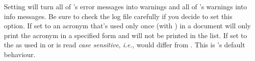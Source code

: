 \documentclass{acro-manual}
\newcommand*\latin[1]{\textit{#1}}
\begin{document}
\begin{options}
    Setting  will turn all of \acro's error messages
    into warnings and all of \acro's warnings into info messages.  Be sure to
    check the log file carefully if you decide to set this option.
    If set to  an acronym that's used only once (with ) in a
    document will only print the acronym in a specified form and will not be
    printed in the list.
    If set to  the  as used in
     or  is read \emph{case sensitive},
    \latin{i.e.},  would differ from .  This is \acro's
    default behaviour.


\end{options}
\end{document}
